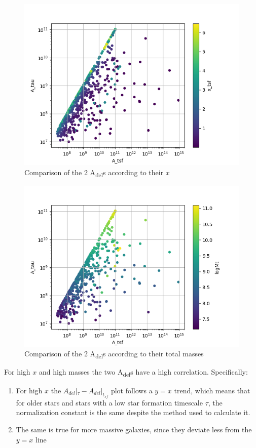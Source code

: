 \documentclass[a4paper,twocolumn]{article}
\begin{document}
\begin{figure}[!htpb]
\centering
\includegraphics[width=.9\linewidth]{./figs/A_tau-A_tsf_colo_X.png}
\caption{\label{fig:Comparison of the 2 A_{del}s according to their $x$}Comparison of the 2 A\textsubscript{del}s according to their \(x\)}
\end{figure}
\begin{figure}[!htpb]
\centering
\includegraphics[width=.9\linewidth]{./figs/A_tau-A_tsf_Mt.png}
\caption{\label{fig:Comparison of the 2 A_{del}s according to their total masses}Comparison of the 2 A\textsubscript{del}s according to their total masses}
\end{figure}

For high \(x\) and high masses the two A\textsubscript{del}s have a high correlation. Specifically:
\begin{enumerate}
\item For high \(x\) the \(A_{del}|_{\tau}-A_{del}|_{t_{sf}}\) plot follows a \(y=x\) trend, which means that for older stars and stars with a low star formation timescale \(\tau\), the normalization constant is the same despite the method used to calculate it.
\item The same is true for more massive galaxies, since they deviate less from the \(y=x\) line
\end{enumerate}
\end{document}
